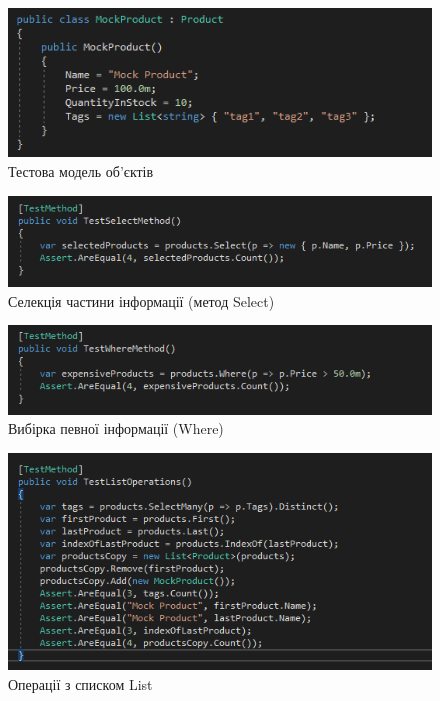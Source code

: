 \documentclass[oneside,14pt]{extarticle}
\begin{document}
\begin{normalsize}
	\begin{figure}[H]
		\centering
		\includegraphics[width=\textwidth]{22}
		\caption{Тестова модель об'єктів}
	\end{figure}

	\begin{figure}[H]
		\centering
		\includegraphics[width=\textwidth]{1}
		\caption{Селекція частини інформації (метод Select)}
	\end{figure}

	\begin{figure}[H]
		\centering
		\includegraphics[width=\textwidth]{2}
		\caption{Вибірка певної інформації (Where)}
	\end{figure}
	
	\begin{figure}[H]
		\centering
		\includegraphics[width=\textwidth]{31}
		\caption{Операції з списком List}
	\end{figure}
	

\end{normalsize}
\end{document}
